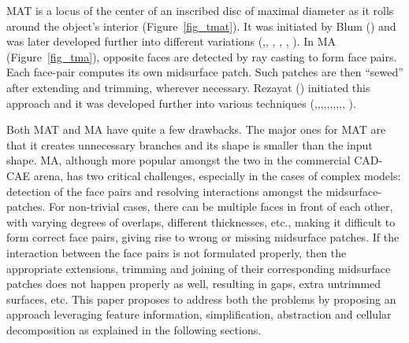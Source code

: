  MAT is a locus of the center of an inscribed disc of maximal diameter as it rolls around the object's interior (Figure~\ref{fig_tmat}). It was initiated by Blum (\cite{Harry1967}) and  was later developed further into different variations (\cite{Lam1992},\cite{Donaghy1996}, \cite{Attali1997}, \cite{DonaghyArmstrongPrice2000}, \cite{Ramanathan2004}, \cite{Robinson2006}). %
In MA  (Figure~\ref{fig_tma}), opposite faces are detected by ray casting to form face pairs.  Each face-pair computes its own  midsurface patch. Such patches are then ``sewed'' after extending and trimming, wherever necessary. Rezayat (\cite{Rezayat1996}) initiated this approach and it was developed further into various techniques (\cite{Fischer1997},\cite{Elber1999},\cite{Chong2004},\cite{ Hamdi2005},\cite{Sheen2005},\cite{Stolt2006a},\cite{Lee2007},\cite{Cao2009},\cite{Sheen2010},\cite{Woo2013}, \cite{Boussuge2013a}).

Both MAT and MA have quite a few drawbacks. The major ones for MAT are that it creates unnecessary branches and its shape is smaller than the input shape. MA, although more popular amongst the two in the commercial CAD-CAE arena, has two critical challenges, especially in the cases of complex models: detection of the face pairs and resolving interactions amongst the midsurface-patches. For non-trivial cases, there can  be multiple faces in front of each other, with varying degrees of overlaps, different thicknesses, etc., making it difficult to form correct face pairs, giving rise to wrong or missing midsurface patches. If the interaction between the face pairs is not formulated properly, then the appropriate extensions, trimming and joining of their corresponding midsurface patches does not happen properly as well, resulting in gaps, extra untrimmed surfaces, etc.  This paper proposes to address both the problems by proposing an approach leveraging feature information, simplification, abstraction and cellular decomposition as explained in the following sections.


